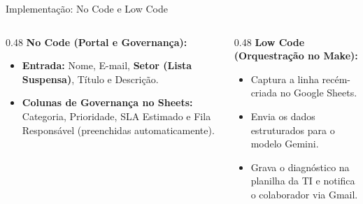 \documentclass[aspectratio=169, 10pt]{beamer}
\begin{document}
\begin{frame}{Implementação: No Code e Low Code}
    \begin{columns}[T]
        \begin{column}{0.48\textwidth}
            \textbf{No Code (Portal e Governança):}
            \begin{itemize}
                \item \textbf{Entrada:} Nome, E-mail, \textbf{Setor (Lista Suspensa)}, Título e Descrição.
                \item \textbf{Colunas de Governança no Sheets:} Categoria, Prioridade, SLA Estimado e Fila Responsável (preenchidas automaticamente).
            \end{itemize}
        \end{column}

        \begin{column}{0.48\textwidth}
            \textbf{Low Code (Orquestração no Make):}
            \begin{itemize}
                \item Captura a linha recém-criada no Google Sheets.
                \item Envia os dados estruturados para o modelo Gemini.
                \item Grava o diagnóstico na planilha da TI e notifica o colaborador via Gmail.
            \end{itemize}
        \end{column}
    \end{columns}

    \vspace{0.4cm}
    \begin{center}
    \end{center}
\end{frame}
\end{document}
